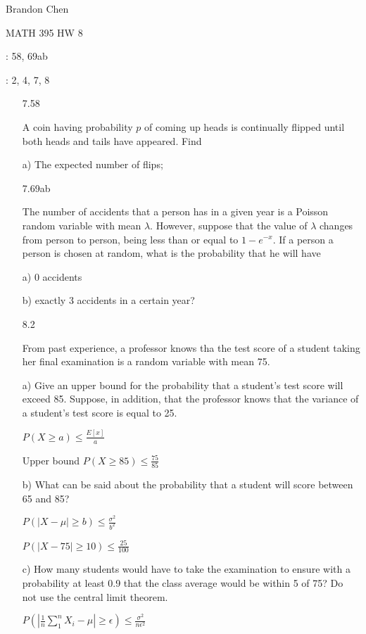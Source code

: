 \documentclass[11pt]{article}
\begin{document}
\noindent Brandon Chen

\noindent MATH 395 HW 8

: 58, 69ab

: 2, 4, 7, 8

\begin{itemize}

	\item[7.58]

		A coin having probability $p$ of coming up heads is
		continually flipped until both heads and tails have 
		appeared. Find

		a) The expected number of flips;


	\item[7.69ab]

		The number of accidents that a person has in a given year 
		is a Poisson random variable with mean $\lambda$. 
		However, suppose that the value of $\lambda$ changes 
		from person to person, being less than or equal to 
		$1 - e^{-x}$. If a person a person is chosen at random,
		what is the probability that he will have

		a) 0 accidents

		b) exactly 3 accidents in a certain year?

	\item[8.2]

		From past experience, a professor knows tha the test 
		score of a student taking her final examination is a 
		random variable with mean 75.

		a) Give an upper bound for the probability that a 
		student's test score will exceed 85. Suppose, 
		in addition, that the professor knows that the 
		variance of a student's test score is equal to 25.

		$P(X \geq a) \leq \frac{E[x]}{a}$

		Upper bound $P(X \geq 85) \leq \frac{75}{85}$

		b) What can be said about the probability that
		a student will score between 65 and 85?

		$P(|X-\mu| \geq b)  \leq \frac{\sigma^2}{b^2}$

		$P(|X-75| \geq 10) \leq \frac{25}{100}$

		c) How many students would have to take the 
		examination to ensure with a probability at least 0.9 
		that the class average would be within 5 of 75? 
		Do not use the central limit theorem.

		$P(|\frac{1}{n} \sum_{1}^{n} X_i
		- \mu| \geq \epsilon) \leq \frac{\sigma^2}{n\epsilon^2}$


\end{itemize}
\end{document}
